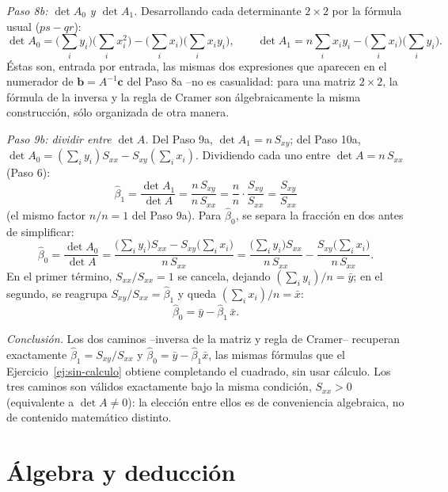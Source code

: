 \documentclass[11pt,a4paper,oneside]{article}
\theoremstyle{plain}
\theoremstyle{definition}
\begin{document}
\emph{Paso 8b: $\det A_0$ y $\det A_1$.} Desarrollando cada determinante
$2\times2$ por la fórmula usual ($ps-qr$):
\[
  \det A_0 = \Big(\sum_iy_i\Big)\Big(\sum_ix_i^2\Big) - \Big(\sum_ix_i\Big)\Big(\sum_ix_iy_i\Big),
  \qquad
  \det A_1 = n\sum_ix_iy_i - \Big(\sum_ix_i\Big)\Big(\sum_iy_i\Big).
\]
Éstas son, entrada por entrada, las mismas dos expresiones que aparecen
en el numerador de $\mathbf b=A^{-1}\mathbf c$ del Paso 8a --no es
casualidad: para una matriz $2\times2$, la fórmula de la inversa y la
regla de Cramer son álgebraicamente la misma construcción, sólo
organizada de otra manera.

\emph{Paso 9b: dividir entre $\det A$.} Del Paso 9a, $\det A_1=n\,S_{xy}$;
del Paso 10a, $\det A_0=(\sum_iy_i)S_{xx}-S_{xy}(\sum_ix_i)$. Dividiendo
cada uno entre $\det A=n\,S_{xx}$ (Paso 6):
\[
  \hat\beta_1=\frac{\det A_1}{\det A}=\frac{n\,S_{xy}}{n\,S_{xx}}
  =\frac{n}{n}\cdot\frac{S_{xy}}{S_{xx}}=\frac{S_{xy}}{S_{xx}}
\]
(el mismo factor $n/n=1$ del Paso 9a). Para $\hat\beta_0$, se separa la
fracción en dos antes de simplificar:
\[
  \hat\beta_0=\frac{\det A_0}{\det A}
  =\frac{\big(\sum_iy_i\big)S_{xx}-S_{xy}\big(\sum_ix_i\big)}{n\,S_{xx}}
  =\frac{\big(\sum_iy_i\big)S_{xx}}{n\,S_{xx}}-\frac{S_{xy}\big(\sum_ix_i\big)}{n\,S_{xx}} .
\]
En el primer término, $S_{xx}/S_{xx}=1$ se cancela, dejando
$(\sum_iy_i)/n=\bar y$; en el segundo, se reagrupa
$S_{xy}/S_{xx}=\hat\beta_1$ y queda $(\sum_ix_i)/n=\bar x$:
\[
  \hat\beta_0 = \bar y - \hat\beta_1\,\bar x .
\]

\emph{Conclusión.} Los dos caminos --inversa de la matriz y regla de
Cramer-- recuperan exactamente $\hat\beta_1=S_{xy}/S_{xx}$ y
$\hat\beta_0=\bar y-\hat\beta_1\bar x$, las mismas fórmulas que el
Ejercicio~\ref{ej:sin-calculo} obtiene completando el cuadrado, sin usar
cálculo. Los tres caminos son válidos exactamente bajo la misma
condición, $S_{xx}>0$ (equivalente a $\det A\neq0$): la elección entre
ellos es de conveniencia algebraica, no de contenido matemático
distinto.

\section{Álgebra y deducción}
\end{document}
